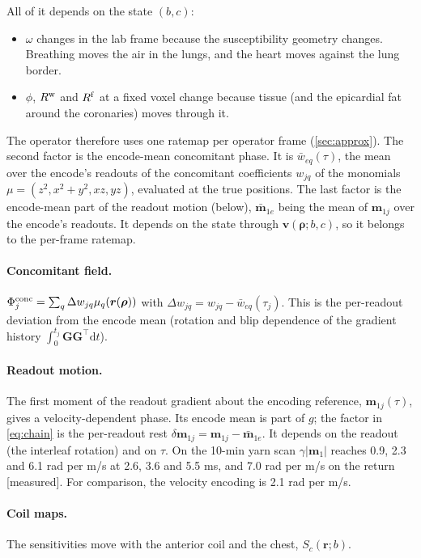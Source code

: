 \documentclass[11pt]{article}
\theoremstyle{remark}
\newcommand{\rr}{\bm r}
\newcommand{\pp}{\bm\rho}
\newcommand{\vv}{\bm v}
\newcommand{\dd}{\mathrm d}
\begin{document}
All of it depends on the state $(b,c)$:
\begin{itemize}
  \item $\omega$ changes in the lab frame because the susceptibility geometry changes. Breathing moves the air in the lungs, and the heart moves against the lung border.
  \item $\phi$, $R^{\rm w}$ and $R^{\rm f}$ at a fixed voxel change because tissue (and the epicardial fat around the coronaries) moves through it.
\end{itemize}
The operator therefore uses one ratemap per operator frame (\cref{sec:approx}). The second factor is the encode-mean concomitant phase. It is $\bar w_{eq}(\tau)$, the mean over the encode's readouts of the concomitant coefficients $w_{jq}$ of the monomials $\mu=(z^2,x^2{+}y^2,xz,yz)$, evaluated at the true positions. The last factor is the encode-mean part of the readout motion (below), $\bar{\bm m}_{1e}$ being the mean of $\bm m_{1j}$ over the encode's readouts. It depends on the state through $\vv(\pp;b,c)$, so it belongs to the per-frame ratemap.

\paragraph{Concomitant field.} $\Phi^{\rm conc}_j=\sum_q\Delta w_{jq}\mu_q(\rr(\pp))$ with $\Delta w_{jq}=w_{jq}-\bar w_{eq}(\tau_j)$. This is the per-readout deviation from the encode mean (rotation and blip dependence of the gradient history $\int_0^{t_j}\bm G\bm G^\top\dd t$).

\paragraph{Readout motion.} The first moment of the readout gradient about the encoding reference, $\bm m_{1j}(\tau)$, gives a velocity-dependent phase. Its encode mean is part of $g$; the factor in \cref{eq:chain} is the per-readout rest $\delta\bm m_{1j}=\bm m_{1j}-\bar{\bm m}_{1e}$. It depends on the readout (the interleaf rotation) and on $\tau$. On the 10-min yarn scan $\gamma|\bm m_1|$ reaches 0.9, 2.3 and 6.1 rad per m/s at 2.6, 3.6 and 5.5 ms, and 7.0 rad per m/s on the return [measured]. For comparison, the velocity encoding is 2.1 rad per m/s.

\paragraph{Coil maps.} The sensitivities move with the anterior coil and the chest, $S_c(\rr;b)$.
\end{document}
